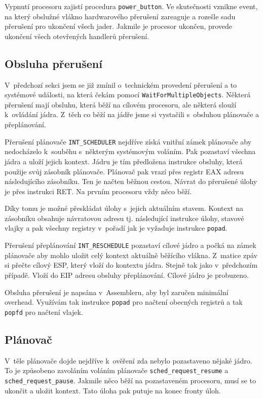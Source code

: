 \documentclass[a4paper,12pt]{article}
\begin{document}
Vypnutí procesoru zajistí procedura \verb+power_button+. Ve skutečnosti vznikne event,
na který obslužné vlákno hardwarového přerušení zareaguje a rozešle sadu přerušení pro
ukončení všech jader. Jakmile je procesor ukončen, provede ukončení všech otevřených
handlerů přerušení.

\subsection{Obsluha přerušení}
V~předchozí sekci jsem se již zmínil o~technickém provedení přerušení a to systémové
události, na která čekám pomocí \verb+WaitForMultipleObjects+. Některá přerušení mají
obsluhu, která běží na cílovém procesoru, ale některá slouží k~ovládání jádra.
Z~těch co běží na jádře jsme si vystačili s~obsluhou plánovače a přeplánování.

Přerušení plánovače \verb+INT_SCHEDULER+ nejdříve získá vnitřní zámek plánovače aby
nedocházelo k~souběhu s~některým systémovým voláním. Pak pozastaví všechna jádra a uloží jejich kontext. Jádru je tím předložena instrukce obsluhy, která použije svůj zásobník plánovače.
Plánovač pak vrazí přes registr EAX adresu následujícího zásobníku. Ten je načten běžnou cestou.
Návrat do přerušené úlohy je přes instrukci RET. Na prvním procesoru vždy něco běží.

Díky tomu je možné přeskládat úlohy s~jejich aktuálním stavem. Kontext na zásobníku
obsahuje návratovou adresu tj. následující instrukce úlohy, stavové vlajky a pak všechny
registry v~pořadí jak je vyžaduje instrukce \texttt{popad}.

Přerušení přeplánování \verb+INT_RESCHEDULE+ pozastaví cílové jádro a počká na zámek
plánovače aby mohlo uložit celý kontext aktuálně běžícího vlákna. Z~matice zpáv si přečte
cílový ESP, který vloží do kontextu jádra. Stejně tak jako v~předchozím případě. Vloží
do EIP adresu obsluhy přeplánování. Cílové jádro je probuzeno.

Obsluha přerušení je napsána v~Assembleru, aby byl zaručen minimální overhead. Využívám tak
instrukce \texttt{popad} pro načtení obecných registrů a tak  \texttt{popfd} pro načtení vlajek.

\subsection{Plánovač}
V~těle plánovače dojde nejdříve k~ověření zda nebylo pozastaveno nějaké jádro. To je
způsobeno zavoláním voláním plánovače \verb+sched_request_resume+ a \verb+sched_request_pause+.
Jakmile něco běží na pozastaveném procesoru, musí se to ukončit a uložit kontext.
Tato úloha pak putuje na konec fronty úloh.
\end{document}
